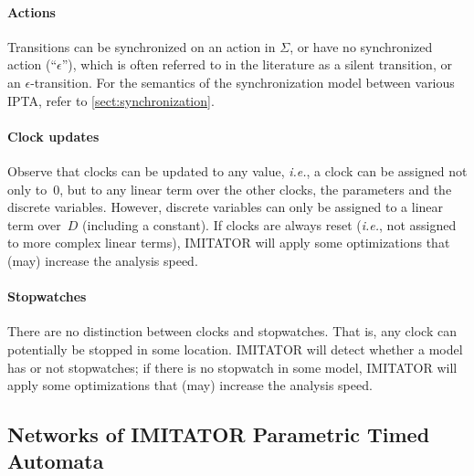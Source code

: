\documentclass[a4paper,11pt]{report}
\newcommand{\Action}{\ensuremath{\Sigma}}
\newcommand{\DVar}{D} %
\newcommand{\unobs}{\ensuremath{\epsilon}}
\newcommand{\imitator}{\textsf{IMITATOR}}
\newcommand{\IPTA}{IPTA}
\newcommand{\ie}{\textcolor{colorok}{\textit{i.e.}, }}
\begin{document}
\paragraph{Actions}
Transitions can be synchronized on an action in $\Action$, or have no synchronized action (``$\unobs$''), which is often referred to in the literature as a silent transition, or an $\epsilon$-transition.
For the semantics of the synchronization model between various \IPTA{}, refer to \cref{sect:synchronization}.

\paragraph{Clock updates}
Observe that clocks can be updated to any value, \ie{} a clock can be assigned not only to~0, but to any linear term over the other clocks, the parameters and the discrete variables.
However, discrete variables can only be assigned to a linear term over~$\DVar$ (including a constant).
If clocks are always reset (\ie{} not assigned to more complex linear terms), \imitator{} will apply some optimizations that (may) increase the analysis speed.

\paragraph{Stopwatches}
There are no distinction between clocks and stopwatches.
That is, any clock can potentially be stopped in some location.
\imitator{} will detect whether a model has or not stopwatches; if there is no stopwatch in some model, \imitator{} will apply some optimizations that (may) increase the analysis speed.


\subsection{Networks of \imitator{} Parametric Timed Automata}
\end{document}
